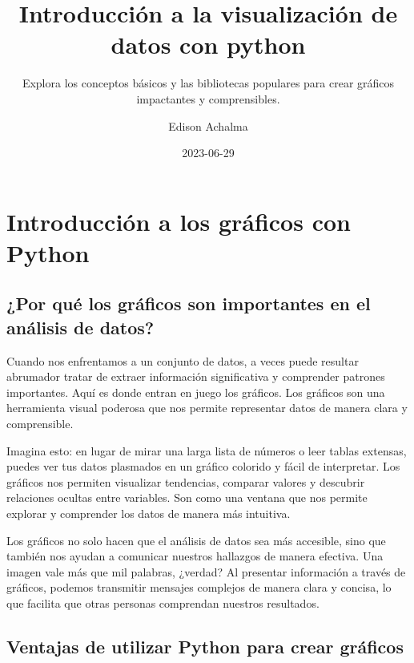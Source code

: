 \documentclass[
  a4paper,
]{article}
\title{Introducción a la visualización de datos con python}
\subtitle{Explora los conceptos básicos y las bibliotecas populares para
crear gráficos impactantes y comprensibles.}
\author{Edison Achalma}
\date{2023-06-29}
\begin{document}
\maketitle
\ifdefined\Shaded\renewenvironment{Shaded}{\begin{tcolorbox}[frame hidden, interior hidden, breakable, borderline west={3pt}{0pt}{shadecolor}, sharp corners, enhanced, boxrule=0pt]}{\end{tcolorbox}}\fi

\hypertarget{introducciuxf3n-a-los-gruxe1ficos-con-python}{%
\section{Introducción a los gráficos con
Python}\label{introducciuxf3n-a-los-gruxe1ficos-con-python}}

\hypertarget{por-quuxe9-los-gruxe1ficos-son-importantes-en-el-anuxe1lisis-de-datos}{%
\subsection{¿Por qué los gráficos son importantes en el análisis de
datos?}\label{por-quuxe9-los-gruxe1ficos-son-importantes-en-el-anuxe1lisis-de-datos}}

Cuando nos enfrentamos a un conjunto de datos, a veces puede resultar
abrumador tratar de extraer información significativa y comprender
patrones importantes. Aquí es donde entran en juego los gráficos. Los
gráficos son una herramienta visual poderosa que nos permite representar
datos de manera clara y comprensible.

Imagina esto: en lugar de mirar una larga lista de números o leer tablas
extensas, puedes ver tus datos plasmados en un gráfico colorido y fácil
de interpretar. Los gráficos nos permiten visualizar tendencias,
comparar valores y descubrir relaciones ocultas entre variables. Son
como una ventana que nos permite explorar y comprender los datos de
manera más intuitiva.

Los gráficos no solo hacen que el análisis de datos sea más accesible,
sino que también nos ayudan a comunicar nuestros hallazgos de manera
efectiva. Una imagen vale más que mil palabras, ¿verdad? Al presentar
información a través de gráficos, podemos transmitir mensajes complejos
de manera clara y concisa, lo que facilita que otras personas comprendan
nuestros resultados.

\hypertarget{ventajas-de-utilizar-python-para-crear-gruxe1ficos}{%
\subsection{Ventajas de utilizar Python para crear
gráficos}\label{ventajas-de-utilizar-python-para-crear-gruxe1ficos}}
\end{document}
